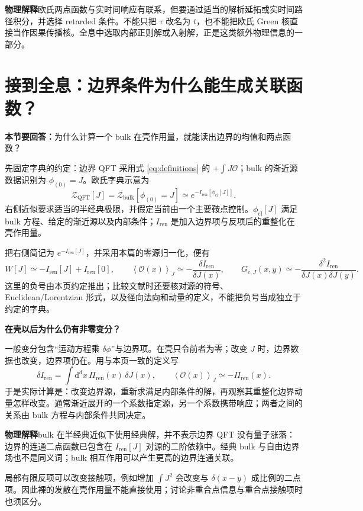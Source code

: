 \documentclass[11pt,a4paper]{article}
\newcommand{\dd}{\mathrm d}
\newcommand{\OO}{\mathcal O}
\newcommand{\ZZ}{\mathcal Z}
\newcommand{\avg}[1]{\left\langle #1\right\rangle}
\newcommand{\physicsnote}[1]{\par\smallskip\noindent\colorbox{pale}{\parbox{\dimexpr\linewidth-2\fboxsep\relax}{\textbf{物理解释}\quad #1}}\par\smallskip}
\newcommand{\question}[1]{\textbf{本节要回答：}#1\par}
\newcommand{\step}[1]{\textbf{#1}\par}
\begin{document}
\physicsnote{欧氏两点函数与实时间响应有联系，但要通过适当的解析延拓或实时间路径积分，并选择 retarded 条件。不能只把 \(\tau\) 改名为 \(t\)，也不能把欧氏 Green 核直接当作因果传播核。全息中选取内部正则解或入射解，正是这类额外物理信息的一部分。}

\newpage
\section{接到全息：边界条件为什么能生成关联函数？}
\question{为什么计算一个 bulk 在壳作用量，就能读出边界的均值和两点函数？}
先固定字典的约定：边界 QFT 采用式 \eqref{eq:definitions} 的 \(+\int J\OO\)；bulk 的渐近源数据识别为 \(\phi_{(0)}=J\)。欧氏字典示意为
\begin{equation}
 \ZZ_{\mathrm{QFT}}[J]
 =\ZZ_{\mathrm{bulk}}[\phi_{(0)}=J]
 \simeq e^{-I_{\mathrm{ren}}[\phi_{\mathrm{cl}}[J]]}.
\end{equation}
右侧近似要求适当的半经典极限，并假定当前由一个主要鞍点控制。\(\phi_{\mathrm{cl}}[J]\) 满足 bulk 方程、给定的渐近源以及内部条件；\(I_{\mathrm{ren}}\) 是加入边界项与反项后的重整化在壳作用量。

把右侧简记为 \(e^{-I_{\mathrm{ren}}[J]}\)，并采用本篇的零源归一化，便有
\begin{equation}\label{eq:holo}
 W[J]\simeq-I_{\mathrm{ren}}[J]+I_{\mathrm{ren}}[0],\qquad
 \avg{\OO(x)}_J\simeq-\frac{\delta I_{\mathrm{ren}}}{\delta J(x)},\qquad
 G_{c,J}(x,y)\simeq-\frac{\delta^2 I_{\mathrm{ren}}}{\delta J(x)\delta J(y)}.
\end{equation}
这里的负号由本页约定推出；比较文献时还要核对源的符号、Euclidean/Lorentzian 形式，以及径向法向和动量的定义，不能把负号当成独立于约定的字典。

\step{在壳以后为什么仍有非零变分？}
一般变分包含“运动方程乘 \(\delta\phi\)”与边界项。在壳只令前者为零；改变 \(J\) 时，边界数据也改变，边界项仍在。用与本页一致的定义写
\begin{equation}
 \delta I_{\mathrm{ren}}=\int\dd^d x\,\Pi_{\mathrm{ren}}(x)\,\delta J(x),
 \qquad \avg{\OO(x)}_J\simeq-\Pi_{\mathrm{ren}}(x).
\end{equation}
于是实际计算是：改变边界源，重新求满足内部条件的解，再观察其重整化边界动量怎样改变。通常渐近展开的一个系数指定源，另一个系数携带响应；两者之间的关系由 bulk 方程与内部条件共同决定。

\physicsnote{bulk 在半经典近似下使用经典解，并不表示边界 QFT 没有量子涨落：边界的连通二点函数已包含在 \(I_{\mathrm{ren}}[J]\) 对源的二阶依赖中。经典 bulk 与自由边界场也不是同义词；bulk 相互作用可以产生更高的边界连通关联。}
局部有限反项可以改变接触项，例如增加 \(\int J^2\) 会改变与 \(\delta(x-y)\) 成比例的二点项。因此裸的发散在壳作用量不能直接使用；讨论非重合点信息与重合点接触项时也须区分。
\end{document}
